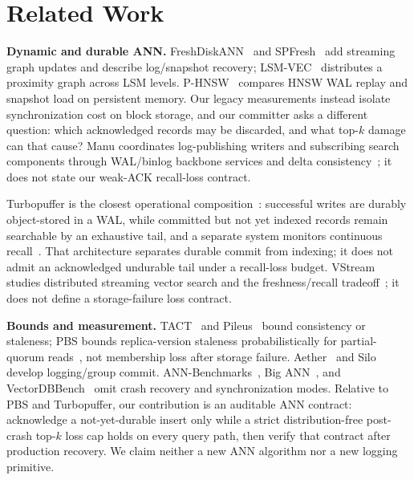 \documentclass[sigconf,nonacm,balance=false]{acmart}
\begin{document}
\section{Related Work}
\label{sec:related}
\textbf{Dynamic and durable ANN.} FreshDiskANN~\cite{freshdiskann} and
SPFresh~\cite{spfresh} add streaming graph updates and describe log/snapshot
recovery; LSM-VEC~\cite{lsmvec} distributes a proximity graph across LSM levels.
P-HNSW~\cite{phnsw} compares HNSW WAL replay and snapshot load on persistent
memory. Our legacy measurements instead isolate synchronization cost on block
storage, and our committer asks a different question: which acknowledged records
may be discarded, and what top-$k$ damage can that cause? Manu coordinates
log-publishing writers and subscribing search components through WAL/binlog
backbone services and delta consistency~\cite{manu}; it does not state our
weak-ACK recall-loss contract.

Turbopuffer is the closest operational composition~\cite{turbopuffer}: successful
writes are durably object-stored in a WAL, while committed but not yet indexed
records remain searchable by an exhaustive tail, and a separate system monitors
continuous recall~\cite{turbopufferrecall}. That architecture separates durable
commit from indexing; it does not admit an acknowledged undurable tail under a
recall-loss budget. VStream studies distributed streaming vector search and
the freshness/recall tradeoff~\cite{vstream}; it does not define a storage-failure
loss contract.

\textbf{Bounds and measurement.} TACT~\cite{tact} and Pileus~\cite{pileus} bound
consistency or staleness; PBS bounds replica-version staleness probabilistically
for partial-quorum reads~\cite{pbs}, not membership loss after storage failure.
Aether~\cite{aether} and Silo~\cite{silo} develop logging/group commit.
ANN-Benchmarks~\cite{annbench}, Big ANN~\cite{bigann}, and
VectorDBBench~\cite{vectordbbench} omit crash recovery and synchronization modes.
Relative to PBS and Turbopuffer, our contribution is an auditable ANN contract:
acknowledge a not-yet-durable insert only while a strict distribution-free
post-crash top-$k$ loss cap holds on every query path, then verify that contract
after production recovery. We claim neither a new ANN algorithm nor a new
logging primitive.
\end{document}
